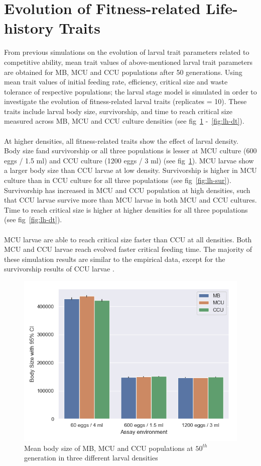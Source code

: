 \section{Evolution of Fitness-related Life-history Traits}
From previous simulations on the evolution of larval trait parameters related to competitive ability, mean trait values of above-mentioned larval trait parameters are obtained for MB, MCU and CCU populations after 50 generations. Using mean trait values of initial feeding rate, efficiency, critical size and waste tolerance of respective populations; the larval stage model is simulated in order to investigate the evolution of fitness-related larval traits (replicates = 10). These traits include larval body size, survivorship, and time to reach critical size measured across MB, MCU and CCU culture densities (see fig~\ref{fig:lh-bs} -~\ref{fig:lh-dt}).\\\\
At higher densities, all fitness-related traits show the effect of larval density. Body size fand survivorship or all three populations is lesser at MCU culture (600 eggs / 1.5 ml) and CCU culture (1200 eggs / 3 ml) (see fig~\ref{fig:lh-bs}). MCU larvae show a larger body size than CCU larvae at low density. Survivorship is higher in MCU culture than in CCU culture for all three populations (see fig~\ref{fig:lh-sur}). Survivorship has increased in MCU and CCU population at high densities, such that CCU larvae survive more than MCU larvae in both MCU and CCU cultures. Time to reach critical size is higher at higher densities for all three populations (see fig~\ref{fig:lh-dt}).\\\\
MCU larvae are able to reach critical size faster than CCU at all densities. Both MCU and CCU larvae reach evolved faster critical feeding time. The majority of these simulation results are similar to the empirical data, except for the survivorship results of CCU larvae \citep{sarangiEcologicalDetailsMediate2018}.
\begin{figure}[h]
  \centering
  \includegraphics[width=.75\textwidth]{C4/Figs/larval_alive_sizec4}
  \caption{Mean body size of MB, MCU and CCU populations at $50^{th}$ generation in three different larval densities}
  \label{fig:lh-bs}
\end{figure}
